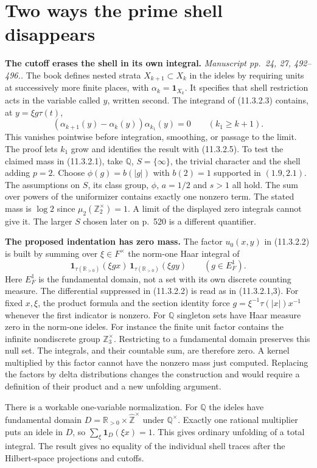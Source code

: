 \documentclass[11pt,letterpaper]{article}
\newcommand{\R}{\mathbb R}
\newcommand{\Q}{\mathbb Q}
\newcommand{\Z}{\mathbb Z}
\newcommand{\one}{\mathbf 1}
\newcommand{\loc}[1]{\textit{Manuscript #1.}}
\newcommand{\head}[1]{\par\smallskip\textbf{#1}\enspace}
\begin{document}
\section{Two ways the prime shell disappears}\label{sec:shell}

\head{The cutoff erases the shell in its own integral.} \loc{pp.~24, 27, 492--496.}
The book defines nested strata $X_{k+1}\subset X_k$ in the ideles by requiring units at successively more finite places, with $\alpha_k=\one_{X_k}$. It specifies that shell restriction acts in the variable called $y$, written second. The integrand of (11.3.2.3) contains, at $y=\xi g\tau(t)$,
\[
 (\alpha_{k+1}(y)-\alpha_k(y))\alpha_{k_1}(y)=0
 \qquad(k_1\ge k+1).
\]
This vanishes pointwise before integration, smoothing, or passage to the limit. The proof lets $k_1$ grow and identifies the result with (11.3.2.5). To test the claimed mass in (11.3.2.1), take $\Q$, $S=\{\infty\}$, the trivial character and the shell adding $p=2$. Choose $\phi(g)=b(|g|)$ with $b(2)=1$ supported in $(1.9,2.1)$. The assumptions on $S$, its class group, $\phi$, $a=1/2$ and $s>1$ all hold. The sum over powers of the uniformizer contains exactly one nonzero term. The stated mass is $\log 2$ since $\mu_2(\Z_2^\times)=1$. A limit of the displayed zero integrals cannot give it. The larger $S$ chosen later on p.~520 is a different quantifier.

\head{The proposed indentation has zero mass.} The factor $u_0(x,y)$ in (11.3.2.2) is built by summing over $\xi\in F^\times$ the norm-one Haar integral of
\[
 \one_{\tau(\R_{>0})}(\xi g x)\,\one_{\tau(\R_{>0})}(\xi g y)
 \qquad (g\in E_F^1).
\]
Here $E_F^1$ is the fundamental domain, not a set with its own discrete counting measure. The differential suppressed in (11.3.2.2) is read as in (11.3.2.1,3). For fixed $x,\xi$, the product formula and the section identity force $g=\xi^{-1}\tau(|x|)x^{-1}$ whenever the first indicator is nonzero. For $\Q$ singleton sets have Haar measure zero in the norm-one ideles. For instance the finite unit factor contains the infinite nondiscrete group $\Z_3^\times$. Restricting to a fundamental domain preserves this null set. The integrals, and their countable sum, are therefore zero. A kernel multiplied by this factor cannot have the nonzero mass just computed. Replacing the factors by delta distributions changes the construction and would require a definition of their product and a new unfolding argument.

There is a workable one-variable normalization. For $\Q$ the ideles have fundamental domain $D=\R_{>0}\times\widehat{\Z}^{\times}$ under $\Q^\times$. Exactly one rational multiplier puts an idele in $D$, so $\sum_{\xi}\one_D(\xi x)=1$. This gives ordinary unfolding of a total integral. The result gives no equality of the individual shell traces after the Hilbert-space projections and cutoffs.
\end{document}
